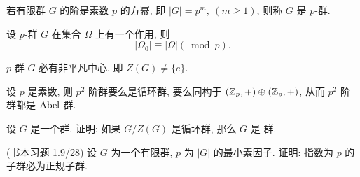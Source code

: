 \begin{definition}\label{p-群}
	若有限群 $G$ 的阶是素数 $p$ 的方幂, 即 $|G|=p^m,\ (m\geqslant 1)$, 则称 $G$ 是 $p$-群.
\end{definition}

\begin{proposition}
	设 $p$-群 $G$ 在集合 $\Omega$ 上有一个作用, 则
	$$|\Omega_0|\equiv|\Omega|(\bmod p).$$
\end{proposition}

\begin{corollary}
	$p$-群 $G$ 必有非平凡中心, 即 $Z(G)\neq \{e\}$.
\end{corollary}

\begin{corollary}
	设 $p$ 是素数, 则 $p^2$ 阶群要么是循环群, 要么同构于 $(\mathbb {Z}_{p},+)\oplus(\mathbb {Z}_{p},+)$, 从而 $p^2$ 阶群都是 $\text {Abel}$ 群.
\end{corollary}

\begin{practice}\label{prac:群作用}
	\problem 设 $G$ 是一个群. 证明: 如果 $G/Z(G)$ 是循环群, 那么 $G$ 是 \Abel 群.

	\problem\label{prac:群作用2}(书本习题 1.9/28) 设 $G$ 为一个有限群, $p$ 为 $|G|$ 的最小素因子. 证明: 指数为 $p$ 的子群必为正规子群.


\end{practice}